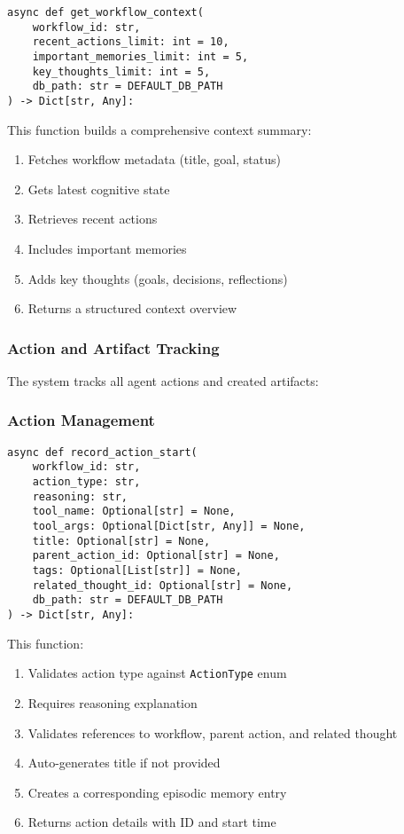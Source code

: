 \documentclass[12pt,a4paper]{article}
\newcommand{\code}[1]{\texttt{#1}}
\begin{document}
\begin{pageablecode}
\begin{verbatim}
async def get_workflow_context(
    workflow_id: str,
    recent_actions_limit: int = 10,
    important_memories_limit: int = 5,
    key_thoughts_limit: int = 5,
    db_path: str = DEFAULT_DB_PATH
) -> Dict[str, Any]:
\end{verbatim}
\end{pageablecode}
This function builds a comprehensive context summary:
\begin{enumerate}[label=\arabic*.]
    \item Fetches workflow metadata (title, goal, status)
    \item Gets latest cognitive state
    \item Retrieves recent actions
    \item Includes important memories
    \item Adds key thoughts (goals, decisions, reflections)
    \item Returns a structured context overview
\end{enumerate}

\subsubsection*{Action and Artifact Tracking}

The system tracks all agent actions and created artifacts:

\subsubsection*{Action Management}
\begin{pageablecode}
\begin{verbatim}
async def record_action_start(
    workflow_id: str,
    action_type: str,
    reasoning: str,
    tool_name: Optional[str] = None,
    tool_args: Optional[Dict[str, Any]] = None,
    title: Optional[str] = None,
    parent_action_id: Optional[str] = None,
    tags: Optional[List[str]] = None,
    related_thought_id: Optional[str] = None,
    db_path: str = DEFAULT_DB_PATH
) -> Dict[str, Any]:
\end{verbatim}
\end{pageablecode}
This function:
\begin{enumerate}[label=\arabic*.]
    \item Validates action type against \code{ActionType} enum
    \item Requires reasoning explanation
    \item Validates references to workflow, parent action, and related thought
    \item Auto-generates title if not provided
    \item Creates a corresponding episodic memory entry
    \item Returns action details with ID and start time
\end{enumerate}
\end{document}
